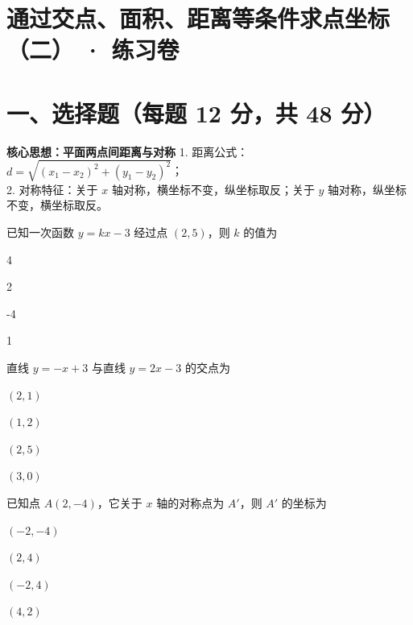 \documentclass{exam-zh}
\begin{document}
\section*{通过交点、面积、距离等条件求点坐标（二） · 练习卷}

\section*{一、选择题（每题 12 分，共 48 分）}


\begin{keyideabox}
  \textbf{核心思想：平面两点间距离与对称}
  1. 距离公式：$d = \sqrt{(x_1-x_2)^2 + (y_1-y_2)^2}$；\\ 2. 对称特征：关于 $x$ 轴对称，横坐标不变，纵坐标取反；关于 $y$ 轴对称，纵坐标不变，横坐标取反。
\end{keyideabox}



\begin{question}[points=12]
  已知一次函数 $y = kx - 3$ 经过点 $(2, 5)$，则 $k$ 的值为
  \begin{choices}
    \item 4
    \item 2
    \item -4
    \item 1
  \end{choices}
\end{question}



\begin{question}[points=12]
  直线 $y = -x + 3$ 与直线 $y = 2x - 3$ 的交点为
  \begin{choices}
    \item $(2, 1)$
    \item $(1, 2)$
    \item $(2, 5)$
    \item $(3, 0)$
  \end{choices}
\end{question}



\begin{question}[points=12]
  已知点 $A(2, -4)$，它关于 $x$ 轴的对称点为 $A'$，则 $A'$ 的坐标为
  \begin{choices}
    \item $(-2, -4)$
    \item $(2, 4)$
    \item $(-2, 4)$
    \item $(4, 2)$
  \end{choices}
\end{question}
\end{document}
